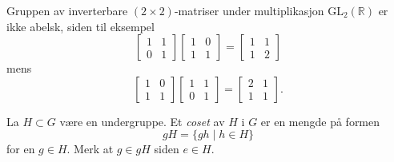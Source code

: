 \begin{example}
    Gruppen av inverterbare $(2\times 2)$-matriser under multiplikasjon
    $\mathrm{GL}_2(\mathbb R)$
    er ikke abelsk, siden til eksempel
    \[
        \begin{bmatrix}
            1 & 1\\
            0 & 1
        \end{bmatrix}
        \begin{bmatrix}
            1 & 0\\
            1 & 1
        \end{bmatrix}
        =
        \begin{bmatrix}
            1 & 1\\
            1 & 2
        \end{bmatrix}
    \]
    mens
    \[
        \begin{bmatrix}
            1 & 0\\
            1 & 1
        \end{bmatrix}
        \begin{bmatrix}
            1 & 1\\
            0 & 1
        \end{bmatrix}
        =
        \begin{bmatrix}
            2 & 1\\
            1 & 1
        \end{bmatrix}.
    \]
\end{example}

\begin{definition}
    La $H\subset G$ være en undergruppe.
    Et \textit{coset} av $H$ i $G$ er en mengde på formen
    \[
        gH = \{gh\mid h\in H\}
    \]
    for en $g\in H$.
    Merk at $g\in gH$ siden $e\in H$.
\end{definition}

